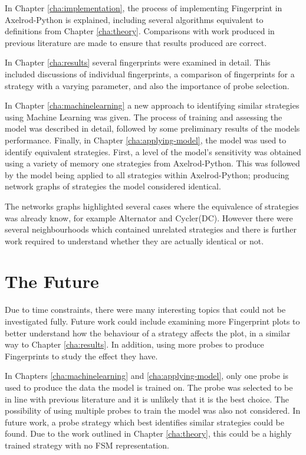 In Chapter \ref{cha:implementation}, the process of implementing Fingerprint in Axelrod-Python is explained, including several algorithms equivalent to definitions from Chapter \ref{cha:theory}.
Comparisons with work produced in previous literature are made to ensure that results produced are correct.

In Chapter \ref{cha:results} several fingerprints were examined in detail.
This included discussions of individual fingerprints, a comparison of fingerprints for a strategy with a varying parameter, and also the importance of probe selection.

In Chapter \ref{cha:machinelearning} a new approach to identifying similar strategies using Machine Learning was given.
The process of training and assessing the model was described in detail, followed by some preliminary results of the models performance.
Finally, in Chapter \ref{cha:applying-model}, the model was used to identify equivalent strategies.
First, a level of the model's sensitivity was obtained using a variety of memory one strategies from Axelrod-Python.
This was followed by the model being applied to all strategies within Axelrod-Python; producing network graphs of strategies the model considered identical.

The networks graphs highlighted several cases where the equivalence of strategies was already know, for example Alternator and Cycler(DC).
However there were several neighbourhoods which contained unrelated strategies and there is further work required to understand whether they are actually identical or not.



\section{The Future}

Due to time constraints, there were many interesting topics that could not be investigated fully.
Future work could include examining more Fingerprint plots to better understand how the behaviour of a strategy affects the plot, in a similar way to Chapter \ref{cha:results}.
In addition, using more probes to produce Fingerprints to study the effect they have.

In Chapters \ref{cha:machinelearning} and \ref{cha:applying-model}, only one probe is used to produce the data the model is trained on.
The probe was selected to be in line with previous literature and it is unlikely that it is the best choice.
The possibility of using multiple probes to train the model was also not considered.
In future work, a probe strategy which best identifies similar strategies could be found.
Due to the work outlined in Chapter \ref{cha:theory}, this could be a highly trained strategy with no FSM representation.

